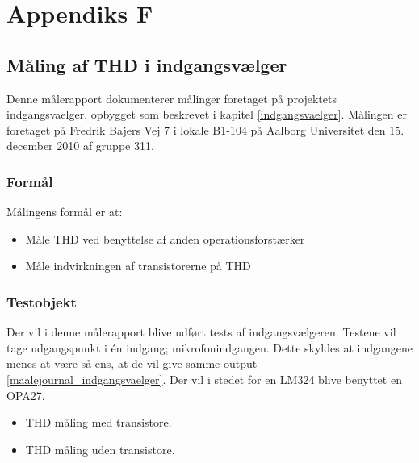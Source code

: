 %
%
\chapter{Appendiks F}
\label{maalejournal_indgangsvaelger_2}
\section*{Måling af THD i indgangsvælger}
Denne målerapport dokumenterer målinger foretaget på projektets indgangsvaelger, opbygget som beskrevet i kapitel \ref{indgangsvaelger}. Målingen er foretaget på Fredrik Bajers Vej 7 i lokale B1-104 på Aalborg Universitet den 15. december 2010 af gruppe 311.

\subsection*{Formål}
Målingens formål er at:
\begin{itemize}
\item Måle THD ved benyttelse af anden operationsforstærker
\item Måle indvirkningen af transistorerne på THD
\end{itemize}

\subsection*{Testobjekt}
Der vil i denne målerapport blive udført tests af indgangsvælgeren. Testene vil tage udgangspunkt i én indgang; mikrofonindgangen. Dette skyldes at indgangene menes at være så ens, at de vil give samme output \ref{maalejournal_indgangsvaelger}. Der vil i stedet for en LM324 blive benyttet en OPA27.
\begin{itemize}
\item THD måling med transistore.
\item THD måling uden transistore.
\end{itemize}

